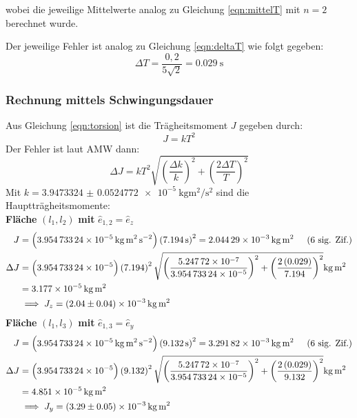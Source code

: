             wobei die jeweilige Mittelwerte analog zu Gleichung \eqref{eqn:mittelT} mit $n = 2$ berechnet wurde. 

            Der jeweilige Fehler ist analog zu Gleichung \eqref{eqn:deltaT} wie folgt gegeben:
            \begin{equation}
                \Delta T = \frac{0,2}{5\sqrt{2}} = \SI{0.029}{\second} \label{eqn:Tfehlerfor2}
            \end{equation}

        \subsubsection{Rechnung mittels Schwingungsdauer}
            Aus Gleichung \eqref{eqn:torsion} ist die Trägheitsmoment $J$ gegeben durch:
            \begin{equation}
                J = k T^2
            \end{equation}
            Der Fehler ist laut AMW dann:
            \begin{equation}
                \Delta J = k T^2 \sqrt{\left(\frac{\Delta k}{k}\right)^2 + \left(\frac{2\Delta T}{T}\right)^2}
            \end{equation}
            Mit $k = \SI{3.9473324(524772)e-5}{\kilo\gram\meter\squared\per\second\squared}$ sind die Hauptträgheitsmomente:\\
            \textbf{Fläche} $(l_1, l_2)$ \textbf{mit} $\hat{e}_{1,2} = \hat{e}_z$ 
            \begin{align}
                J &= \left(\SI{3.95473324e-5}{\kilo\gram\meter\squared\per\second\squared}\right)\left(\SI{7.194}{\second}\right)^2 = \SI{2.04429e-3}{\kilo\gram\meter\squared} \sigfig{6} \\
                \Delta J &= \left(\SI{3.95473324e-5}{}\right)\left(\SI{7.194}{}\right)^2 \sqrt{\left(\frac{\SI{5.24772e-7}{}}{\SI{3.95473324e-5}{}}\right)^2 + \left(\frac{2\left(\SI{0.029}{}\right)}{\SI{7.194}{}}\right)^2} \SI{}{\kilo\gram\meter\squared} \notag \\
                &= \SI{3.177e-5}{\kilo\gram\meter\squared} \\
                &\implies J_z = \SI{2.04(4)e-3}{\kilo\gram\meter\squared}
            \end{align}
            \textbf{Fläche} $(l_1, l_3)$ \textbf{mit} $\hat{e}_{1,3} = \hat{e}_y$ 
            \begin{align}
                J &= \left(\SI{3.95473324e-5}{\kilo\gram\meter\squared\per\second\squared}\right)\left(\SI{9.132}{\second}\right)^2 = \SI{3.29182e-3}{\kilo\gram\meter\squared} \sigfig{6} \\
                \Delta J &= \left(\SI{3.95473324e-5}{}\right)\left(\SI{9.132}{}\right)^2 \sqrt{\left(\frac{\SI{5.24772e-7}{}}{\SI{3.95473324e-5}{}}\right)^2 + \left(\frac{2\left(\SI{0.029}{}\right)}{\SI{9.132}{}}\right)^2} \SI{}{\kilo\gram\meter\squared} \notag \\
                &= \SI{4.851e-5}{\kilo\gram\meter\squared} \\
                &\implies J_y = \SI{3.29(5)e-3}{\kilo\gram\meter\squared}
            \end{align}
